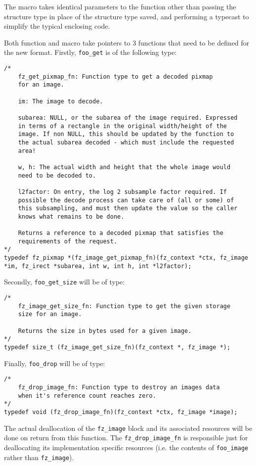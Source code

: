 \documentclass[oneside]{book}
\begin{document}
The macro takes identical parameters to the function other than passing the structure type in place of the structure type saved, and performing a typecast to simplify the typical enclosing code. 

Both function and macro take pointers to 3 functions that need to be defined for the new format. Firstly, \texttt{foo\_get} is of the following type:

\begin{lstlisting}
/*
	fz_get_pixmap_fn: Function type to get a decoded pixmap
	for an image.

	im: The image to decode.

	subarea: NULL, or the subarea of the image required. Expressed
	in terms of a rectangle in the original width/height of the
	image. If non NULL, this should be updated by the function to
	the actual subarea decoded - which must include the requested
	area!

	w, h: The actual width and height that the whole image would
	need to be decoded to.

	l2factor: On entry, the log 2 subsample factor required. If
	possible the decode process can take care of (all or some) of
	this subsampling, and must then update the value so the caller
	knows what remains to be done.

	Returns a reference to a decoded pixmap that satisfies the
	requirements of the request.
*/
typedef fz_pixmap *(fz_image_get_pixmap_fn)(fz_context *ctx, fz_image *im, fz_irect *subarea, int w, int h, int *l2factor);
\end{lstlisting}

Secondly, \texttt{foo\_get\_size} will be of type:

\begin{lstlisting}
/*
	fz_image_get_size_fn: Function type to get the given storage
	size for an image.

	Returns the size in bytes used for a given image.
*/
typedef size_t (fz_image_get_size_fn)(fz_context *, fz_image *);
\end{lstlisting}

Finally, \texttt{foo\_drop} will be of type:

\begin{lstlisting}
/*
	fz_drop_image_fn: Function type to destroy an images data
	when it's reference count reaches zero.
*/
typedef void (fz_drop_image_fn)(fz_context *ctx, fz_image *image);
\end{lstlisting}

The actual deallocation of the \texttt{fz\_image} block and its associated resources will be done on return from this function. The \texttt{fz\_drop\_image\_fn} is responsible just for deallocating its implementation specific resources (i.e. the contents of \texttt{foo\_image} rather than \texttt{fz\_image}).
\end{document}

